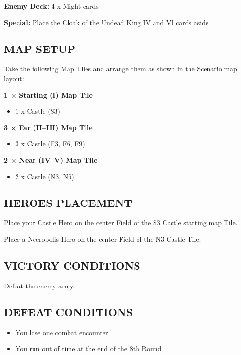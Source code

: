 \begin{multicols*}{2}
\textbf{Enemy Deck:} 4 x Might cards

\textbf{Special:} Place the Cloak of the Undead King IV and VI cards aside

\subsection*{\MakeUppercase{Map setup}}

Take the following Map Tiles and arrange them as shown in the Scenario map layout:

\textbf{1 × Starting (I) Map Tile}
\begin{itemize}
    \item 1 x Castle (S3)
\end{itemize}

\textbf{3 × Far (II--III) Map Tile}
\begin{itemize}
    \item 3 x Castle (F3, F6, F9)
\end{itemize}

\textbf{2 × Near (IV--V) Map Tile}
\begin{itemize}
    \item 2 x Castle (N3, N6)
\end{itemize}

\subsection*{\MakeUppercase{Heroes placement}}

Place your Castle Hero on the center Field of the S3 Castle starting map Tile.

Place a Necropolis Hero on the center Field of the N3 Castle Tile.

\subsection*{\MakeUppercase{Victory Conditions}}

Defeat the enemy army.

\subsection*{\MakeUppercase{Defeat Conditions}}
\begin{itemize}
  \item You lose one combat encounter
  \item You run out of time at the end of the 8th Round
\end{itemize}
\end{multicols*}

